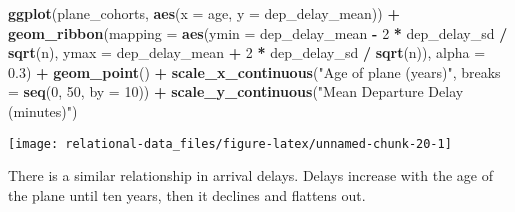 \documentclass[]{book}
\newenvironment{Shaded}{\begin{snugshade}}{\end{snugshade}}
\newcommand{\DataTypeTok}[1]{\textcolor[rgb]{0.13,0.29,0.53}{#1}}
\newcommand{\DecValTok}[1]{\textcolor[rgb]{0.00,0.00,0.81}{#1}}
\newcommand{\FloatTok}[1]{\textcolor[rgb]{0.00,0.00,0.81}{#1}}
\newcommand{\KeywordTok}[1]{\textcolor[rgb]{0.13,0.29,0.53}{\textbf{#1}}}
\newcommand{\NormalTok}[1]{#1}
\newcommand{\OperatorTok}[1]{\textcolor[rgb]{0.81,0.36,0.00}{\textbf{#1}}}
\newcommand{\StringTok}[1]{\textcolor[rgb]{0.31,0.60,0.02}{#1}}
\theoremstyle{plain}
\theoremstyle{remark}
\begin{document}
\begin{Shaded}
\begin{Highlighting}[]
\KeywordTok{ggplot}\NormalTok{(plane_cohorts, }\KeywordTok{aes}\NormalTok{(}\DataTypeTok{x =}\NormalTok{ age, }\DataTypeTok{y =}\NormalTok{ dep_delay_mean)) }\OperatorTok{+}
\StringTok{  }\KeywordTok{geom_ribbon}\NormalTok{(}\DataTypeTok{mapping =} \KeywordTok{aes}\NormalTok{(}\DataTypeTok{ymin =}\NormalTok{ dep_delay_mean }\OperatorTok{-}\StringTok{ }
\StringTok{                              }\DecValTok{2} \OperatorTok{*}\StringTok{ }\NormalTok{dep_delay_sd }\OperatorTok{/}\StringTok{ }\KeywordTok{sqrt}\NormalTok{(n), }
                            \DataTypeTok{ymax =}\NormalTok{ dep_delay_mean }\OperatorTok{+}\StringTok{ }
\StringTok{                              }\DecValTok{2} \OperatorTok{*}\StringTok{ }\NormalTok{dep_delay_sd }\OperatorTok{/}\StringTok{ }\KeywordTok{sqrt}\NormalTok{(n)),}
              \DataTypeTok{alpha =} \FloatTok{0.3}\NormalTok{) }\OperatorTok{+}
\StringTok{  }\KeywordTok{geom_point}\NormalTok{() }\OperatorTok{+}
\StringTok{  }\KeywordTok{scale_x_continuous}\NormalTok{(}\StringTok{"Age of plane (years)"}\NormalTok{, }\DataTypeTok{breaks =} \KeywordTok{seq}\NormalTok{(}\DecValTok{0}\NormalTok{, }\DecValTok{50}\NormalTok{, }\DataTypeTok{by =} \DecValTok{10}\NormalTok{)) }\OperatorTok{+}
\StringTok{  }\KeywordTok{scale_y_continuous}\NormalTok{(}\StringTok{"Mean Departure Delay (minutes)"}\NormalTok{)}
\end{Highlighting}
\end{Shaded}

\begin{center}\texttt{[image: relational-data\_files/figure-latex/unnamed-chunk-20-1]} \end{center}

There is a similar relationship in arrival delays. Delays increase with
the age of the plane until ten years, then it declines and flattens out.
\end{document}
